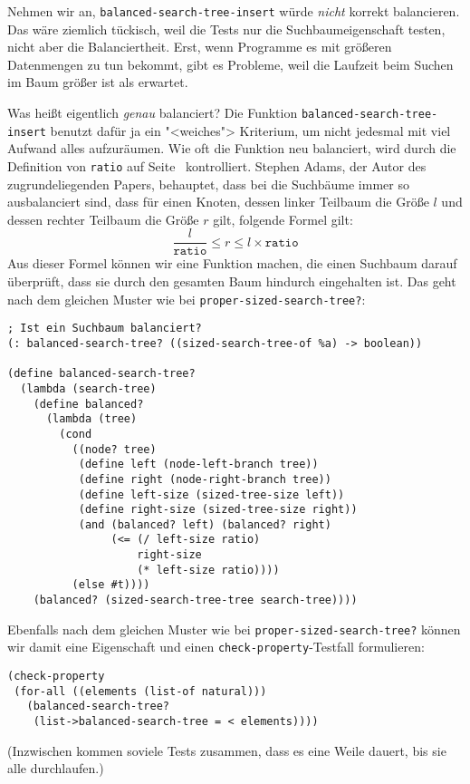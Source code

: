 Nehmen wir an, \lstinline{balanced-search-tree-insert} würde
\emph{nicht} korrekt balancieren.  Das wäre ziemlich tückisch, weil
die Tests nur die Suchbaumeigenschaft testen, nicht aber die
Balanciertheit.
Erst, wenn Programme es mit größeren Datenmengen zu tun bekommt, gibt es Probleme,
weil die Laufzeit beim Suchen im Baum größer ist als erwartet.

Was heißt eigentlich \emph{genau} balanciert?  Die Funktion
\lstinline{balanced-search-tree-insert} benutzt dafür ja ein
"<weiches"> Kriterium, um nicht jedesmal mit viel Aufwand alles
aufzuräumen.  Wie oft die Funktion neu balanciert, wird durch die
Definition von \lstinline{ratio} auf Seite~\pageref{def:ratio}
kontrolliert.  Stephen Adams, der Autor des zugrundeliegenden Papers,
behauptet, dass bei die Suchbäume immer so ausbalanciert sind, dass
für einen Knoten, dessen linker Teilbaum die Größe $l$
und dessen rechter Teilbaum die Größe $r$ gilt, folgende Formel gilt:
%
\begin{displaymath}
  \frac{l}{\mathtt{ratio}} \leq r \leq l \times \mathtt{ratio}
\end{displaymath}
%
Aus dieser Formel können wir eine Funktion machen, die einen Suchbaum
darauf überprüft, dass sie durch den gesamten Baum hindurch
eingehalten ist.  Das geht nach dem gleichen Muster wie bei
\lstinline{proper-sized-search-tree?}:
%
\begin{lstlisting}
; Ist ein Suchbaum balanciert?
(: balanced-search-tree? ((sized-search-tree-of %a) -> boolean))

(define balanced-search-tree?
  (lambda (search-tree)
    (define balanced?
      (lambda (tree)
        (cond
          ((node? tree)
           (define left (node-left-branch tree))
           (define right (node-right-branch tree)) 
           (define left-size (sized-tree-size left))
           (define right-size (sized-tree-size right))
           (and (balanced? left) (balanced? right)
                (<= (/ left-size ratio)
                    right-size
                    (* left-size ratio))))
          (else #t))))
    (balanced? (sized-search-tree-tree search-tree))))
\end{lstlisting}
%
Ebenfalls nach dem gleichen Muster wie bei
\lstinline{proper-sized-search-tree?} können wir damit eine
Eigenschaft und einen \lstinline{check-property}-Testfall formulieren:
%
\begin{lstlisting}
(check-property
 (for-all ((elements (list-of natural)))
   (balanced-search-tree?
    (list->balanced-search-tree = < elements))))
\end{lstlisting}
%
(Inzwischen kommen soviele Tests zusammen, dass es eine Weile
dauert, bis sie alle durchlaufen.)

